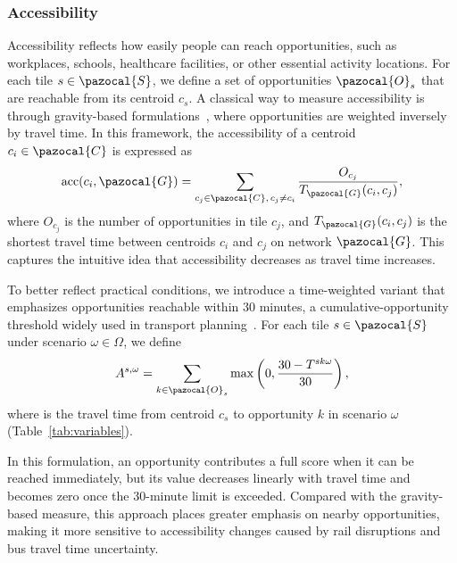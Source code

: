 \documentclass[3p,times,procedia]{elsarticle}
\begin{document}
\subsubsection{Accessibility}\label{sec:TWA}
Accessibility reflects how easily people can reach opportunities, such as workplaces, schools, healthcare facilities, or other essential activity locations. 
%
For each tile $s \in \pazocal{S}$, we define a set of opportunities $\pazocal{O}_s$ that are reachable from its centroid $c_s$.  
%
A classical way to measure accessibility is through gravity-based formulations~\citep{hansen1959accessibility,geurs2004accessibility},
where opportunities are weighted inversely by travel time.
In this framework, the accessibility of a centroid $c_i \in \pazocal{C}$ is expressed as
\begin{equation}
    \text{acc}(c_i, \pazocal{G}) = \sum_{c_j \in \pazocal{C}, \, c_j \neq c_i} \frac{O_{c_j}}{T_{\pazocal{G}}(c_i, c_j)},
\end{equation}
where $O_{c_j}$ is the number of opportunities in tile $c_j$, 
and $T_{\pazocal{G}}(c_i, c_j)$ is the shortest travel time between centroids $c_i$ and $c_j$ on network $\pazocal{G}$. 
This captures the intuitive idea that accessibility decreases as travel time increases.  

To better reflect practical conditions, we introduce a time-weighted variant that emphasizes opportunities reachable within 30 minutes,
a cumulative-opportunity threshold widely used in transport planning~\citep{geurs2004accessibility}.
For each tile $s \in \pazocal{S}$ under scenario $\omega \in \Omega$, we define
\begin{equation}
    A^{s,\omega} = \sum_{k \in \pazocal{O}_s} \max\left(0, \frac{30 - T^{sk\omega}}{30}\right),
    \label{eq:Acc}
\end{equation}
where  is the travel time from centroid $c_s$ to opportunity $k$ in scenario $\omega$ (Table~\ref{tab:variables}).

In this formulation, an opportunity contributes a full score when it can be reached immediately, 
but its value decreases linearly with travel time and becomes zero once the 30-minute limit is exceeded. 
Compared with the gravity-based measure, this approach places greater emphasis on nearby opportunities, 
making it more sensitive to accessibility changes caused by rail disruptions and bus travel time uncertainty.
\end{document}
